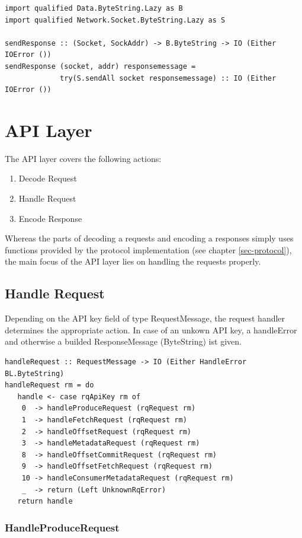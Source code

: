 \begin{lstlisting}
import qualified Data.ByteString.Lazy as B
import qualified Network.Socket.ByteString.Lazy as S

sendResponse :: (Socket, SockAddr) -> B.ByteString -> IO (Either IOError ())
sendResponse (socket, addr) responsemessage = 
             try(S.sendAll socket responsemessage) :: IO (Either IOError ())
\end{lstlisting}

\section{API Layer}
\label{sec:broker-api}
The API layer covers the following actions: 
\begin{enumerate}
    \item Decode Request
    \item Handle Request
    \item Encode Response
\end{enumerate}

Whereas the parts of decoding a requests and encoding a responses simply uses functions
provided by the protocol implementation (see chapter \ref{sec-protocol}), the
main focus of the API layer lies on handling the requests properly. 

\subsection{Handle Request}
\label{sec:impl-broker-api-handle}
Depending on the API key field of type RequestMessage, the request handler
determines the appropriate action. In case of an unkown API key, a handleError
and otherwise a builded ResponseMessage (ByteString) ist given. 

\begin{lstlisting}
handleRequest :: RequestMessage -> IO (Either HandleError BL.ByteString)
handleRequest rm = do
   handle <- case rqApiKey rm of
    0  -> handleProduceRequest (rqRequest rm)
    1  -> handleFetchRequest (rqRequest rm)
    2  -> handleOffsetRequest (rqRequest rm)
    3  -> handleMetadataRequest (rqRequest rm)
    8  -> handleOffsetCommitRequest (rqRequest rm)
    9  -> handleOffsetFetchRequest (rqRequest rm)
    10 -> handleConsumerMetadataRequest (rqRequest rm)
    _  -> return (Left UnknownRqError)
   return handle
\end{lstlisting}

\subsubsection{HandleProduceRequest}

